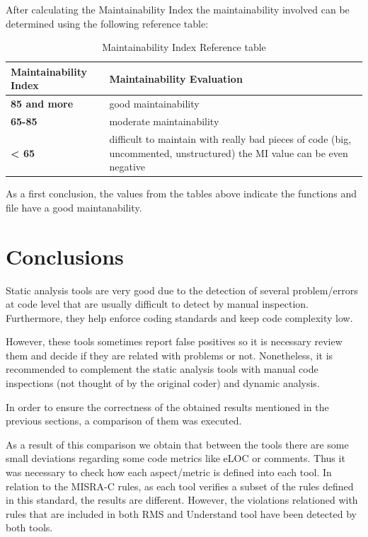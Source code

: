After calculating the Maintainability Index the maintainability involved can be determined using the following reference table:

{\footnotesize\sffamily\centering
  \begin{longtable}{||p{}|p{}||}
  \caption{Maintainability Index Reference table}\\
    \hline\hline
    \textbf{Maintainability Index} & \textbf{Maintainability Evaluation} \\
    \hline\hline
    \endhead
    \hline\hline
    \endfoot
    \textbf{85 and more}
& good maintainability
    \\
    \hline
    \textbf{65-85}
& moderate maintainability
    \\
    \hline
    \textbf{< 65}
& difficult to maintain
with really bad pieces of code (big, uncommented, unstructured) the MI value can be even negative
    \\
    \hline
\end{longtable}}

As a first conclusion, the values from the tables above indicate the functions and file have a good maintanability.

\section{Conclusions}

Static analysis tools are very good due to the detection of several problem/errors at code level that are usually difficult to detect by manual inspection. Furthermore, they help enforce coding standards and keep code complexity low.

However, these tools sometimes report false positives so it is necessary review them and decide if they are related with problems or not. Nonetheless, it is recommended to complement the static analysis tools with manual code inspections (not thought of by the original coder) and dynamic analysis.

In order to ensure the correctness of the obtained results mentioned in the previous sections, a comparison of them was executed.

As a result of this comparison we obtain that between the tools there are some small deviations regarding some code metrics like eLOC or comments. Thus it was necessary to check how each aspect/metric is defined into each tool. In relation to the MISRA-C rules, as each tool verifies a subset of the rules defined in this standard, the results are different. However, the violations relationed with rules that are included in both RMS and Understand tool have been detected by both tools.


